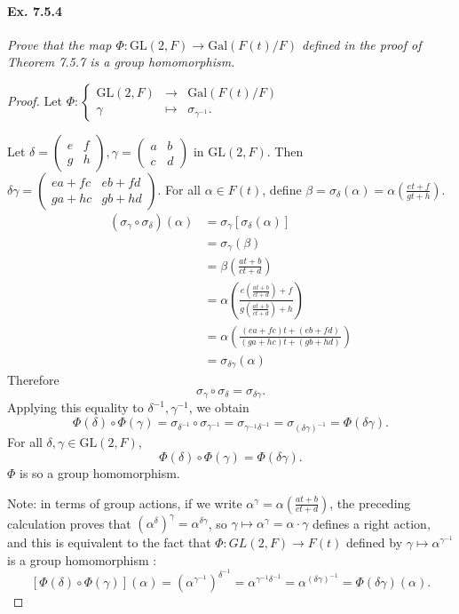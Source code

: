 \documentclass[11pt,a4paper]{article}
\newcommand{\Gal}{\mathrm{Gal}}
\begin{document}
\paragraph{Ex. 7.5.4}

{\it Prove that the map $\Phi : \mathrm{GL}(2,F) \to \Gal(F(t)/F)$ defined in the proof of Theorem 7.5.7 is a group homomorphism.
}

\begin{proof}
Let
$\Phi:
\left\{
\begin{array}{ccc}
 \mathrm{GL}(2,F) &\to   & \Gal(F(t)/F)   \\
 \gamma & \mapsto    &  \sigma_{\gamma^{-1}}.    
\end{array}
\right.
$

Let
$
\delta =
\left(
\begin{array}{cc}
 e &  f\\
 g &   h  
\end{array}
\right),
\gamma =
\left(
\begin{array}{cc}
 a &  b\\
 c &   d  
\end{array}
\right)
$ in $\mathrm{GL}(2,F)$. Then
$
 \delta \gamma= 
\left(
\begin{array}{cc}
 ea+fc &  eb+fd\\
 ga+hc&   gb+hd 
\end{array}
\right).
$
For all $\alpha \in F(t)$, define $\beta= \sigma_\delta(\alpha) = \alpha\left(\frac{et+f}{gt+h}\right)$.
\begin{align*}
(\sigma_\gamma \circ \sigma_\delta)(\alpha)&=\sigma_\gamma[\sigma_\delta(\alpha)]\\
 &= \sigma_\gamma(\beta)\\
&=\beta\left(\frac{at+b}{ct+d}\right)\\
&=\alpha\left(\frac{e\left(\frac{at+b}{ct+d}\right)+f}{g\left(\frac{at+b}{ct+d}\right)+h}\right)\\
&=\alpha\left(\frac{(ea+fc)t+(eb+fd)}{(ga+hc)t+(gb+hd)}\right)\\
&=\sigma_{\delta \gamma}(\alpha)
\end{align*}
Therefore
$$\sigma_\gamma \circ \sigma_\delta = \sigma_{\delta \gamma}.$$
Applying this equality to $\delta^{-1}, \gamma^{-1}$, we obtain
$$
\Phi(\delta) \circ \Phi(\gamma) = \sigma_{\delta^{-1}} \circ \sigma_{\gamma^{-1}}
= \sigma_{\gamma^{-1} \delta^{-1}}
=\sigma_{(\delta \gamma)^{-1}}
=\Phi(\delta \gamma).
$$
For all $\delta,\gamma \in \mathrm{GL}(2,F)$,
$$\Phi(\delta) \circ \Phi(\gamma)  = \Phi(\delta \gamma).$$
$\Phi$ is so a group homomorphism.

Note: in terms of group actions, if we write $ \alpha^\gamma= \alpha(\frac{at+b}{ct+d})$, the preceding calculation proves that $(\alpha^\delta)^\gamma = \alpha^{\delta \gamma}$, so $\gamma \mapsto \alpha^{\gamma} = \alpha \cdot \gamma$ defines a right action, and this is equivalent to the fact that $\Phi : GL(2,F) \to F(t)$ defined by $\gamma \mapsto \alpha^{\gamma^{-1}}$ is a group homomorphism :
$$[\Phi(\delta) \circ \Phi(\gamma)](\alpha) =( \alpha^{\gamma^{-1}}) ^{\delta^{-1}} = \alpha^{\gamma^{-1} \delta^{-1}} = \alpha^{(\delta \gamma)^{-1}} = \Phi(\delta \gamma)(\alpha).$$
\end{proof}
\end{document}
